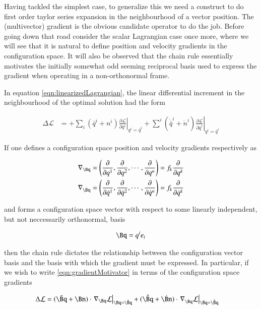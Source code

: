 \documentclass{article}
\newcommand{\LL}[0]{\mathcal{L}}
\newcommand{\qdot}[0]{\dot{q}}
\newcommand{\ndot}[0]{\dot{n}}
\newcommand{\qbar}[0]{\bar{q}}
\newcommand{\qdotbar}[0]{\dot{\bar{q}}}
\newcommand{\PD}[2]{\frac{\partial {#2}}{\partial {#1}}}
\newcommand{\grad}[0]{\nabla}
\begin{document}
Having tackled the simplest case, to generalize this we need a construct to do first order taylor series expansion in the neighbourhood of a vector
position.  The (multivector) gradient is the obvious candidate operator to do the job.
Before going down that road consider the scalar Lagrangian case once more, where we will see that it is natural to define position and velocity gradients
in the configuration space.  It will also be observed that the chain rule essentially motivates the initially somewhat odd seeming reciprocal basis
used to express the gradient when operating in a non-orthonormal frame.

In equation \ref{eqn:linearizedLagrangian}, the linear differential increment in the neighbourhood of the optimal solution had the form

\begin{align}\label{eqn:gradientMotivator}
\Delta \LL &=
+ \sum_i (\qbar^i + n^i) \left. \PD{q^i}{\LL} \right\vert_{q^i = \qbar^i}
+ \sum^i (\qdotbar^i + \ndot^i) \left. \PD{\qdot^i}{\LL} \right\vert_{q^i = \qbar^i}
\end{align}

If one defines a configuration space position and velocity gradients respectively as

\begin{align*}
\grad_{\Bq} &= \left(\PD{q^1}{}, \PD{q^2}{}, \cdots, \PD{q^n}{}\right) = f_k \PD{q^k}{} \\
\grad_{\dot{\Bq}} &= \left(\PD{\qdot^1}{}, \PD{\qdot^2}{}, \cdots, \PD{\qdot^n}{}\right) = f_k \PD{\qdot^k}{}
\end{align*}

and forms a configuration space vector with respect to some linearly independent, but not neccessarily orthonormal, basis

\begin{align*}
\Bq = q^i e_i
\end{align*}

then the chain rule dictates the relationship between the configuration vector basis and the basis with which the gradient must be expressed.  In
particular, if we wish to write \ref{eqn:gradientMotivator} in terms of the configuration space gradients

\begin{align*}
\Delta \LL &=
(\bar{\Bq} + \Bn) \cdot \left.\grad_\Bq \LL \right\vert_{\Bq = \bar{\Bq}}
+ (\dot{\bar{\Bq}} + \dot{\Bn}) \cdot \left.\grad_{\dot{\Bq}} \LL \right\vert_{\dot{\Bq} = \dot{\bar{\Bq}}}
\end{align*}
\end{document}
